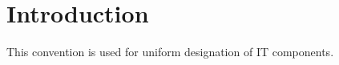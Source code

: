 %
%
%
%
%
%
%

\section{Introduction}

This convention is used for uniform designation of IT components.
